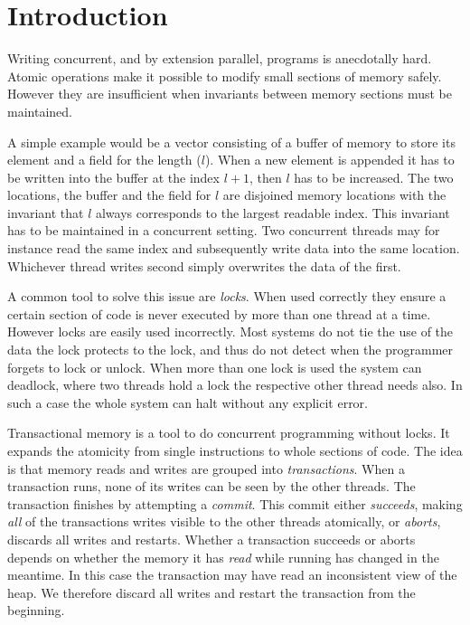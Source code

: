 \section{Introduction}

\label{sec:introduction}

Writing concurrent, and by extension parallel, programs is anecdotally hard.
Atomic operations make it possible to modify small sections of memory safely.
However they are insufficient when invariants between memory sections must be
maintained.

A simple example would be a vector consisting of a buffer of memory to store its
element and a field for the length ($l$). When a new element is appended it has
to be written into the buffer at the index $l + 1$, then $l$ has to be
increased. The two locations, the buffer and the field for $l$ are disjoined
memory locations with the invariant that $l$ always corresponds to the largest
readable index. This invariant has to be maintained in a concurrent setting. Two
concurrent threads may for instance read the same index and subsequently write
data into the same location. Whichever thread writes second simply overwrites
the data of the first.

A common tool to solve this issue are \emph{locks}. When used correctly they
ensure a certain section of code is never executed by more than one thread at a
time. However locks are easily used incorrectly. Most systems do not tie the use
of the data the lock protects to the lock, and thus do not detect when the
programmer forgets to lock or unlock. When more than one lock is used the system
can deadlock, where two threads hold a lock the respective other thread needs
also. In such a case the whole system can halt without any explicit error.

Transactional memory is a tool to do concurrent programming without locks. It
expands the atomicity from single instructions to whole sections of code. The
idea is that memory reads and writes are grouped into \emph{transactions}. When
a transaction runs, none of its writes can be seen by the other threads. The
transaction finishes by attempting a \emph{commit}. This commit either
\emph{succeeds}, making \emph{all} of the transactions writes visible to the
other threads atomically, or \emph{aborts}, discards all writes and restarts.
Whether a transaction succeeds or aborts depends on whether the memory it has
\emph{read} while running has changed in the meantime. In this case the
transaction may have read an inconsistent view of the heap. We therefore discard
all writes and restart the transaction from the beginning.


